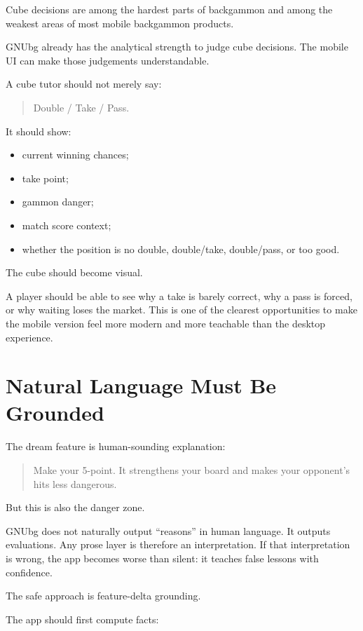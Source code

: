 \documentclass[11pt,a4paper]{article}
\begin{document}
Cube decisions are among the hardest parts of backgammon and among the weakest areas of most mobile backgammon products.

GNUbg already has the analytical strength to judge cube decisions. The mobile UI can make those judgements understandable.

A cube tutor should not merely say:

\begin{quote}
Double / Take / Pass.
\end{quote}

It should show:

\begin{itemize}
  \item current winning chances;
  \item take point;
  \item gammon danger;
  \item match score context;
  \item whether the position is no double, double/take, double/pass, or too good.
\end{itemize}

The cube should become visual.

A player should be able to see why a take is barely correct, why a pass is forced, or why waiting loses the market. This is one of the clearest opportunities to make the mobile version feel more modern and more teachable than the desktop experience.

\section{Natural Language Must Be Grounded}

The dream feature is human-sounding explanation:

\begin{quote}
Make your 5-point. It strengthens your board and makes your opponent's hits less dangerous.
\end{quote}

But this is also the danger zone.

GNUbg does not naturally output ``reasons'' in human language. It outputs evaluations. Any prose layer is therefore an interpretation. If that interpretation is wrong, the app becomes worse than silent: it teaches false lessons with confidence.

The safe approach is feature-delta grounding.

The app should first compute facts:
\end{document}
